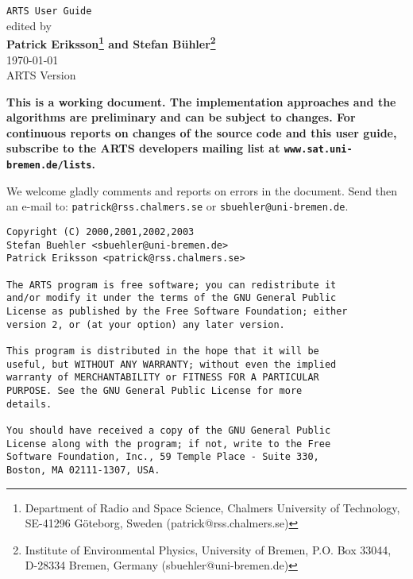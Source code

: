 







%
%
\renewcommand{\thepage}{title \arabic{page}} 

\thispagestyle{plain}
\begin{center}
  \vspace*{2cm}
  {\Huge \verb|ARTS User Guide|\\}
  \vspace*{1cm}
  {\large edited by \\}
  \vspace*{1cm}
  {\Large \bf Patrick Eriksson\footnote{
      Department of Radio and Space Science, 
      Chalmers University of Technology, SE-41296 G\"oteborg, Sweden
      (patrick@rss.chalmers.se)} and
    Stefan B\"uhler\footnote{
      Institute of Environmental Physics, University of Bremen, 
      P.O. Box 33044, D-28334 Bremen, Germany
      (sbuehler@uni-bremen.de)}  
    }\\
   \vspace*{2cm}
   {\large \today\\
    ARTS Version 
   }
\end{center}
\vspace*{4cm}
{\normalsize \bf
  \noindent
  This is a working document. The implementation approaches and the
  algorithms are preliminary and can be subject to changes.  For
  continuous reports on changes of the source code and this user guide,
  subscribe to the ARTS developers mailing list at 
  \verb|www.sat.uni-bremen.de/lists|.

  We welcome gladly comments and reports on errors in the document.
  Send then an e-mail to: \verb|patrick@rss.chalmers.se| or 
  \verb|sbuehler@uni-bremen.de|.
}

\newpage                          
\thispagestyle{empty}
\vspace*{\fill}
\noindent
\begin{verbatim}
Copyright (C) 2000,2001,2002,2003 
Stefan Buehler <sbuehler@uni-bremen.de>
Patrick Eriksson <patrick@rss.chalmers.se>

The ARTS program is free software; you can redistribute it
and/or modify it under the terms of the GNU General Public
License as published by the Free Software Foundation; either
version 2, or (at your option) any later version.

This program is distributed in the hope that it will be
useful, but WITHOUT ANY WARRANTY; without even the implied
warranty of MERCHANTABILITY or FITNESS FOR A PARTICULAR
PURPOSE. See the GNU General Public License for more
details. 

You should have received a copy of the GNU General Public
License along with the program; if not, write to the Free
Software Foundation, Inc., 59 Temple Place - Suite 330,
Boston, MA 02111-1307, USA. 
\end{verbatim}




